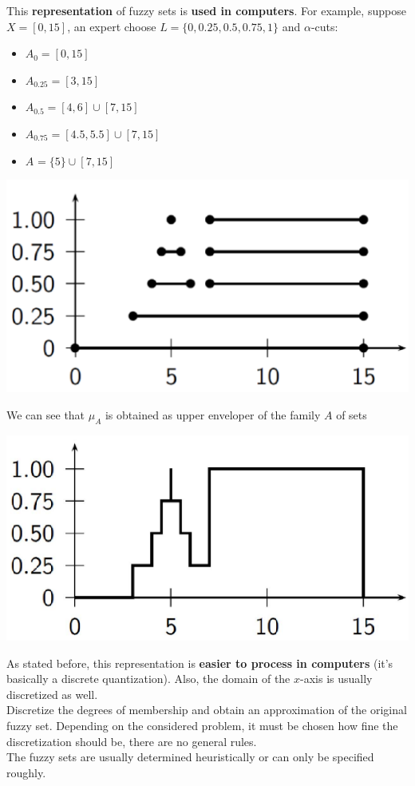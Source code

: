 This \textbf{representation} of fuzzy sets is \textbf{used in computers}. For example, suppose $X = [0, 15]$, an expert choose $L = \{0, 0.25, 0.5, 0.75, 1\}$ and $\alpha$-cuts:
\begin{itemize}
	\item $A_0 = [0,15]$
	\item $A_{0.25} = [3,15]$
	\item $A_{0.5} = [4,6] \cup [7,15]$
	\item $A_{0.75} = [4.5,5.5] \cup [7, 15]$
	\item $A_{} = \{5\} \cup [7,15]$
\end{itemize}
\begin{center}
	\includegraphics[width=0.55\columnwidth]{img/FS/hr2}
\end{center}

\newpage

We can see that $\mu_A$ is obtained as upper enveloper of the family $A$ of sets
\begin{center}
	\includegraphics[width=0.55\columnwidth]{img/FS/hr3}
\end{center}
As stated before, this representation is \textbf{easier to process in computers} (it's basically a discrete quantization). Also, the domain of the $x$-axis is usually discretized as well.\\

Discretize the degrees of membership and obtain an approximation of the original fuzzy set. Depending on the considered problem, it must be chosen how fine the discretization should be, there are no general rules.\\
The fuzzy sets are usually determined heuristically or can only be specified roughly.\\


